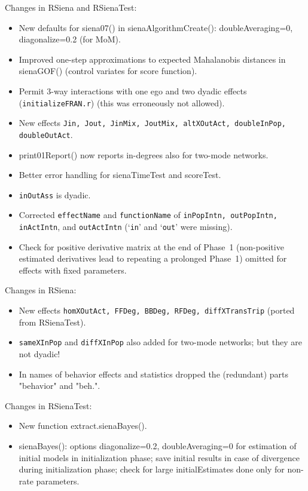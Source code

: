\documentclass[a4paper,fleqn,11pt]{article}
\newcommand{\+}{\, + \,}
\newcommand{\sfn}[1]{\textsf{#1}}
\begin{document}
\begin{small}
\begin{itemize}
Changes in RSiena and RSienaTest:
\begin{itemize}
   \item New defaults for \sfn{siena07()} in \sfn{sienaAlgorithmCreate()}:
     doubleAveraging=0, diagonalize=0.2 (for MoM).
   \item Improved one-step approximations to expected Mahalanobis
     distances in \sfn{sienaGOF()} (control variates for score function).
   \item Permit 3-way interactions with one ego and two dyadic effects
     (\texttt{initializeFRAN.r}) (this was erroneously not allowed).
   \item New effects \texttt{Jin, Jout, JinMix, JoutMix, altXOutAct,
     doubleInPop, doubleOutAct}.
   \item \sfn{print01Report()} now reports in-degrees also for two-mode networks.
   \item Better error handling for \sfn{sienaTimeTest} and \sfn{scoreTest}.
   \item \texttt{inOutAss} is dyadic.
   \item Corrected \texttt{effectName} and \texttt{functionName} of \texttt{inPopIntn, outPopIntn,
     inActIntn}, and \texttt{outActIntn} (`\texttt{in}' and `\texttt{out}' were missing).
  \item Check for positive derivative matrix at the end of Phase~1 (non-positive
     estimated derivatives lead to repeating a prolonged Phase~1)
     omitted for effects with fixed parameters.
\end{itemize}

Changes in RSiena:
\begin{itemize}
   \item New effects \texttt{homXOutAct, FFDeg, BBDeg, RFDeg, diffXTransTrip}
     (ported from RSienaTest).
   \item \texttt{sameXInPop} and \texttt{diffXInPop} also added for two-mode networks;
     but they are not dyadic!
   \item In names of behavior effects and statistics dropped the
     (redundant) parts "behavior" and "beh.".
\end{itemize}

Changes in RSienaTest:
\begin{itemize}
   \item New function \sfn{extract.sienaBayes()}.
   \item \sfn{sienaBayes()}: options diagonalize=0.2, doubleAveraging=0 for estimation
     of initial models in initialization phase; save initial results in case of
     divergence during initialization phase;
     check for large initialEstimates done only for non-rate parameters.
\end{itemize}


\end{itemize}
\end{small}
\end{document}
